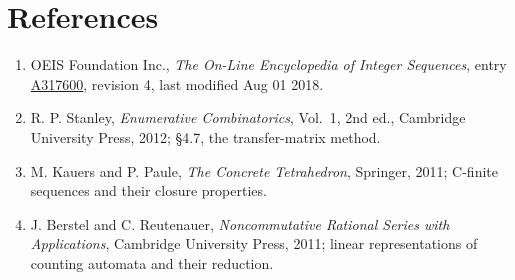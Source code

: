 \documentclass[11pt]{article}
\theoremstyle{definition}
\begin{document}
\section{References}

\begin{enumerate}

\item OEIS Foundation Inc., \emph{The On-Line Encyclopedia of Integer Sequences}, entry \href{https://oeis.org/A317600}{A317600}, revision 4, last modified Aug 01 2018.

\item R. P. Stanley, \emph{Enumerative Combinatorics}, Vol.~1, 2nd ed., Cambridge University Press, 2012; \S4.7, the transfer-matrix method.

\item M. Kauers and P. Paule, \emph{The Concrete Tetrahedron}, Springer, 2011; C-finite sequences and their closure properties.

\item J. Berstel and C. Reutenauer, \emph{Noncommutative Rational Series with Applications}, Cambridge University Press, 2011; linear representations of counting automata and their reduction.

\end{enumerate}
\end{document}
